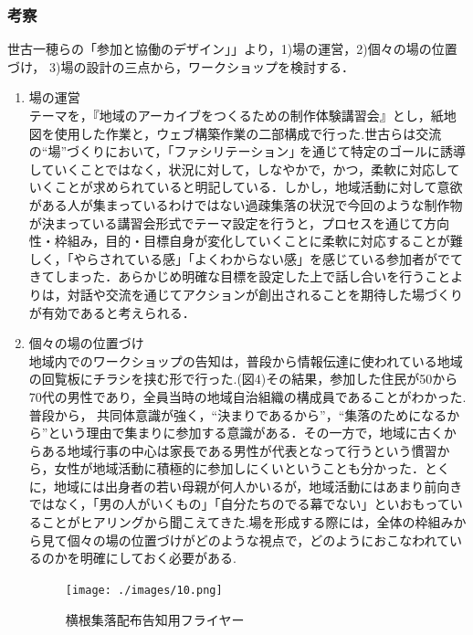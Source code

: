 \documentclass[a4paper]{jsarticle}
\begin{document}
\subsubsection{考察}
世古一穂らの「参加と協働のデザイン」」\cite{13}より，1)場の運営，2)個々の場の位置づけ， 3)場の設計の三点から，ワークショップを検討する．\\
\begin{enumerate}
\item 場の運営\\
テーマを，『地域のアーカイブをつくるための制作体験講習会』とし，紙地図を使用した作業と，ウェブ構築作業の二部構成で行った.世古ら\cite{13}は交流の“場”づくりにおいて，｢ファシリテーション｣ を通じて特定のゴールに誘導していくことではなく，状況に対して，しなやかで，かつ，柔軟に対応していくことが求められていると明記している．しかし，地域活動に対して意欲がある人が集まっているわけではない過疎集落の状況で今回のような制作物が決まっている講習会形式でテーマ設定を行うと，プロセスを通じて方向性・枠組み，目的・目標自身が変化していくことに柔軟に対応することが難しく，「やらされている感」「よくわからない感」を感じている参加者がでてきてしまった．あらかじめ明確な目標を設定した上で話し合いを行うことよりは，対話や交流を通じてアクションが創出されることを期待した場づくりが有効であると考えられる．\\

\item  個々の場の位置づけ\\
地域内でのワークショップの告知は，普段から情報伝達に使われている地域の回覧板にチラシを挟む形で行った.(図4)その結果，参加した住民が50から70代の男性であり，全員当時の地域自治組織の構成員であることがわかった.普段から， 共同体意識が強く，“決まりであるから”，“集落のためになるから”という理由で集まりに参加する意識がある．その一方で，地域に古くからある地域行事の中心は家長である男性が代表となって行うという慣習から，女性が地域活動に積極的に参加しにくいということも分かった．とくに，地域には出身者の若い母親が何人かいるが，地域活動にはあまり前向きではなく，「男の人がいくもの」「自分たちのでる幕でない」といおもっていることがヒアリングから聞こえてきた.場を形成する際には，全体の枠組みから見て個々の場の位置づけがどのような視点で，どのようにおこなわれているのかを明確にしておく必要がある.\\
\begin{figure}[H]
  \begin{center}
    \texttt{[image: ./images/10.png]}
    \caption{横根集落配布告知用フライヤー}
    \label{fig:tmu_hino}
  \end{center}
\end{figure}


\end{enumerate}
\end{document}
